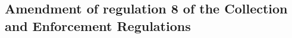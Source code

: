 \documentclass[12pt,a4paper]{article}
\begin{document}
%
%
%
%
%
%
%
%

\subsection[41. Amendment of regulation 8 of the Collection and Enforcement Regulations]{Amendment of regulation 8 of the Collection and Enforcement Regulations}
\end{document}
